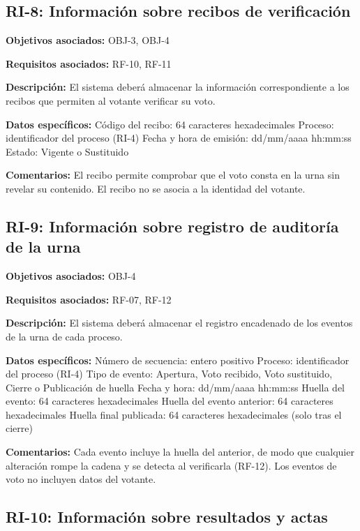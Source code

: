 \subsection{RI-8: Información sobre recibos de verificación}

\textbf{Objetivos asociados:} OBJ-3, OBJ-4\par
\textbf{Requisitos asociados:} RF-10, RF-11\par
\textbf{Descripción:} El sistema deberá almacenar la información correspondiente a los recibos que permiten al votante verificar su voto.\par
\textbf{Datos específicos:} Código del recibo: 64 caracteres hexadecimales Proceso: identificador del proceso (RI-4) Fecha y hora de emisión: dd/mm/aaaa hh:mm:ss Estado: Vigente o Sustituido\par
\textbf{Comentarios:} El recibo permite comprobar que el voto consta en la urna sin revelar su contenido. El recibo no se asocia a la identidad del votante.\par

\subsection{RI-9: Información sobre registro de auditoría de la urna}

\textbf{Objetivos asociados:} OBJ-4\par
\textbf{Requisitos asociados:} RF-07, RF-12\par
\textbf{Descripción:} El sistema deberá almacenar el registro encadenado de los eventos de la urna de cada proceso.\par
\textbf{Datos específicos:} Número de secuencia: entero positivo Proceso: identificador del proceso (RI-4) Tipo de evento: Apertura, Voto recibido, Voto sustituido, Cierre o Publicación de huella Fecha y hora: dd/mm/aaaa hh:mm:ss Huella del evento: 64 caracteres hexadecimales Huella del evento anterior: 64 caracteres hexadecimales Huella final publicada: 64 caracteres hexadecimales (solo tras el cierre)\par
\textbf{Comentarios:} Cada evento incluye la huella del anterior, de modo que cualquier alteración rompe la cadena y se detecta al verificarla (RF-12). Los eventos de voto no incluyen datos del votante.\par

\subsection{RI-10: Información sobre resultados y actas}

